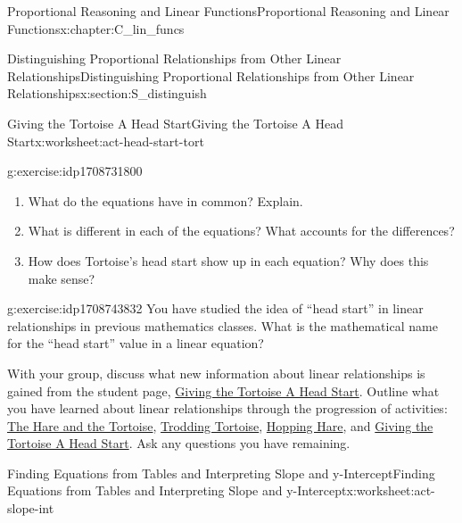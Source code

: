 \documentclass[oneside,10pt,]{book}
\numberwithin{equation}{chapter}
\begin{document}
\begin{chapterptx}{Proportional Reasoning and Linear Functions}{}{Proportional Reasoning and Linear Functions}{}{}{x:chapter:C_lin_funcs}
\begin{sectionptx}{Distinguishing Proportional Relationships from Other Linear Relationships}{}{Distinguishing Proportional Relationships from Other Linear Relationships}{}{}{x:section:S_distinguish}
\begin{worksheet-subsection}{Giving the Tortoise A Head Start}{}{Giving the Tortoise A Head Start}{}{}{x:worksheet:act-head-start-tort}
\begin{divisionexercise}{4}{}{}{g:exercise:idp1708731800}
\begin{enumerate}[font=\bfseries,label=(\alph*),ref=\alph*]
\item{}What do the equations have in common? Explain.%
\item{}What is different in each of the equations? What accounts for the differences?%
\item{}How does Tortoise's head start show up in each equation? Why does this make sense?%
\end{enumerate}
\end{divisionexercise}%
\begin{divisionexercise}{5}{}{}{g:exercise:idp1708743832}%
You have studied the idea of ``head start'' in linear relationships in previous mathematics classes. What is the mathematical name for the “head start” value in a linear equation?%
\end{divisionexercise}%
\begin{conclusion}{}%
With your group, discuss what new information about linear relationships is gained from the student page, \hyperref[x:worksheet:act-head-start-tort]{Giving the Tortoise A Head Start}. Outline what you have learned about linear relationships through the progression of activities: \hyperref[x:worksheet:act-hare-tort]{The Hare and the Tortoise}, \hyperref[x:worksheet:act-trod-tort]{Trodding Tortoise}, \hyperref[x:worksheet:act-hop-hare]{Hopping Hare}, and \hyperref[x:worksheet:act-head-start-tort]{Giving the Tortoise A Head Start}. Ask any questions you have remaining.%
\end{conclusion}%
\end{worksheet-subsection}
\restoregeometry
%
%
\typeout{************************************************}
\typeout{************************************************}
%
\begin{worksheet-subsection}{Finding Equations from Tables and Interpreting Slope and y-Intercept}{}{Finding Equations from Tables and Interpreting Slope and y-Intercept}{}{}{x:worksheet:act-slope-int}
\begin{introduction}{}%

\end{introduction}
\end{worksheet-subsection}
\end{sectionptx}
\end{chapterptx}
\end{document}
